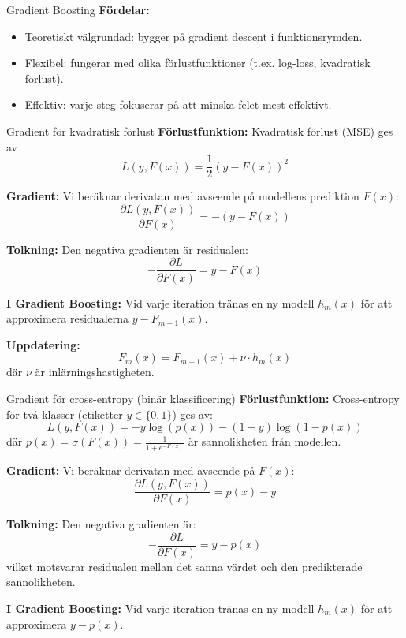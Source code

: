 \documentclass[10pt,english]{beamer}
\begin{document}
\begin{frame}{Gradient Boosting}
  \textbf{Fördelar:}
  \begin{itemize}
    \item Teoretiskt välgrundad: bygger på gradient descent i funktionsrymden.
    \item Flexibel: fungerar med olika förlustfunktioner (t.ex. log-loss, kvadratisk förlust).
    \item Effektiv: varje steg fokuserar på att minska felet mest effektivt.
  \end{itemize}
\end{frame}



\begin{frame}{Gradient för kvadratisk förlust}
  \textbf{Förlustfunktion:} Kvadratisk förlust (MSE) ges av
  \[
    L(y, F(x)) = \frac{1}{2}(y - F(x))^2
  \]

  
  \textbf{Gradient:} Vi beräknar derivatan med avseende på modellens prediktion $F(x)$:
  \[
    \frac{\partial L(y, F(x))}{\partial F(x)} = - (y - F(x))
  \]

  
  \textbf{Tolkning:} Den negativa gradienten är residualen:
  \[
    -\frac{\partial L}{\partial F(x)} = y - F(x)
  \]

  
  \textbf{I Gradient Boosting:} Vid varje iteration tränas en ny modell $h_m(x)$ för att approximera residualerna $y - F_{m-1}(x)$.

  
  \textbf{Uppdatering:}
  \[
    F_m(x) = F_{m-1}(x) + \nu \cdot h_m(x)
  \]
  där $\nu$ är inlärningshastigheten.
\end{frame}



\begin{frame}{Gradient för cross-entropy (binär klassificering)}
  \textbf{Förlustfunktion:} Cross-entropy för två klasser (etiketter $y \in \{0, 1\}$) ges av:
  \[
    L(y, F(x)) = -y \log(p(x)) - (1 - y) \log(1 - p(x))
  \]
  \vspace{0.4cm}
  där $p(x) = \sigma(F(x)) = \frac{1}{1 + e^{-F(x)}}$ är sannolikheten från modellen.

  
  \textbf{Gradient:} Vi beräknar derivatan med avseende på $F(x)$:
  \[
    \frac{\partial L(y, F(x))}{\partial F(x)} = p(x) - y
  \]

  
  \textbf{Tolkning:} Den negativa gradienten är:
  \[
    -\frac{\partial L}{\partial F(x)} = y - p(x)
  \]
  vilket motsvarar residualen mellan det sanna värdet och den predikterade sannolikheten.

  \textbf{I Gradient Boosting:} Vid varje iteration tränas en ny modell $h_m(x)$ för att approximera $y - p(x)$.
\end{frame}
\end{document}
